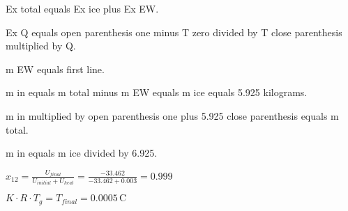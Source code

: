 Ex total equals Ex ice plus Ex EW.  

Ex Q equals open parenthesis one minus T zero divided by T close parenthesis multiplied by Q.  

m EW equals first line.  

m in equals m total minus m EW equals m ice equals 5.925 kilograms.  

m in multiplied by open parenthesis one plus 5.925 close parenthesis equals m total.  

m in equals m ice divided by 6.925.

\( x_{12} = \frac{U_{final}}{U_{initial} + U_{heat}} = \frac{-33.462}{-33.462 + 0.003} = 0.999 \)  

\( K \cdot R \cdot T_{g} = T_{final} = 0.0005 \, \text{C} \)